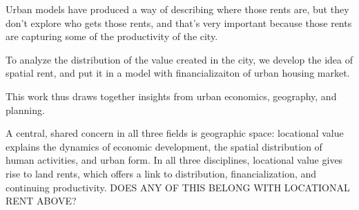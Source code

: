 
Urban models have produced a way of describing where those rents are, but they don't explore who gets those rents, and that's very important because those rents are capturing some of the productivity of the city. 

To analyze the distribution of the value created in the city, we develop the idea of spatial rent, and put it in a model with financializaiton of urban housing market.

This work thus draws together insights from urban economics, geography, and planning. 

A central, shared concern in all three fields is geographic space: locational value explains the dynamics of economic development, the spatial distribution of human activities, and urban form.  
In all three disciplines, locational value gives rise to land rents, which offers a link to distribution, financialization, and continuing productivity.  DOES ANY OF THIS BELONG WITH LOCATIONAL RENT ABOVE?


